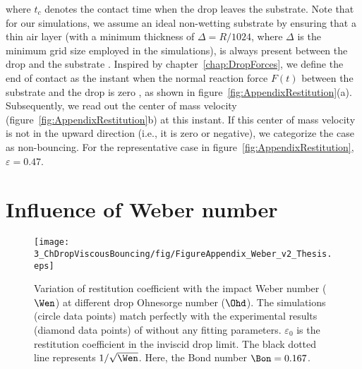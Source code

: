 \begin{subappendices}
	\noindent where $t_c$ denotes the contact time when the drop leaves the substrate. Note that for our simulations, we assume an ideal non-wetting substrate by ensuring that a thin air layer (with a minimum thickness of $\Delta = R/1024$, where $\Delta$ is the minimum grid size employed in the simulations), is always present between the drop and the substrate \citep[also see][]{ramirez2020lifting}. Inspired by chapter~\ref{chap:DropForces}, we define the end of contact as the instant when the normal reaction force $F(t)$ between the substrate and the drop is zero \citep[for calculation details, see equation~\eqref{Ch2:Eqn::force2} and][]{zhang2022impact}, as shown in figure~\ref{fig:AppendixRestitution}(a). Subsequently, we read out the center of mass velocity (figure~\ref{fig:AppendixRestitution}b) at this instant. If this center of mass velocity is not in the upward direction (i.e., it is zero or negative), we categorize the case as non-bouncing. For the representative case in figure~\ref{fig:AppendixRestitution}, $\varepsilon = 0.47$. 
	
	\section{Influence of Weber number}\label{app:Weber}
	\begin{figure}
		\centering
		\texttt{[image: 3\_ChDropViscousBouncing/fig/FigureAppendix\_Weber\_v2\_Thesis.eps]}
		\caption{Variation of restitution coefficient with the impact Weber number ($\Wen$) at different drop Ohnesorge number ($\Ohd$). The simulations (circle data points) match perfectly with the experimental results (diamond data points) of \citet{jha2020viscous} without any fitting parameters. $\varepsilon_0$ is the restitution coefficient in the inviscid drop limit. The black dotted line represents $1/\sqrt{\Wen}$. Here, the Bond number $\Bon =0.167$.}
		\label{fig:AppendixWeber}
	\end{figure}
	

\end{subappendices}
